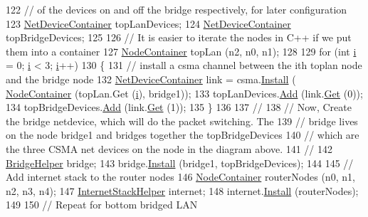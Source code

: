 \begin{DoxyCode}
122   \textcolor{comment}{// of the devices on and off the bridge respectively, for later configuration }
123   \hyperlink{classns3_1_1NetDeviceContainer}{NetDeviceContainer} topLanDevices;
124   \hyperlink{classns3_1_1NetDeviceContainer}{NetDeviceContainer} topBridgeDevices;
125 
126   \textcolor{comment}{// It is easier to iterate the nodes in C++ if we put them into a container}
127   \hyperlink{classns3_1_1NodeContainer}{NodeContainer} topLan (n2, n0, n1);
128 
129   \textcolor{keywordflow}{for} (\textcolor{keywordtype}{int} \hyperlink{bernuolliDistribution_8m_a6f6ccfcf58b31cb6412107d9d5281426}{i} = 0; \hyperlink{bernuolliDistribution_8m_a6f6ccfcf58b31cb6412107d9d5281426}{i} < 3; \hyperlink{bernuolliDistribution_8m_a6f6ccfcf58b31cb6412107d9d5281426}{i}++)
130     \{
131       \textcolor{comment}{// install a csma channel between the ith toplan node and the bridge node}
132       \hyperlink{classns3_1_1NetDeviceContainer}{NetDeviceContainer} link = csma.\hyperlink{classns3_1_1CsmaHelper_af79a91372595230b0817200270ab84e7}{Install} (
      \hyperlink{classns3_1_1NodeContainer}{NodeContainer} (topLan.Get (\hyperlink{bernuolliDistribution_8m_a6f6ccfcf58b31cb6412107d9d5281426}{i}), bridge1));
133       topLanDevices.\hyperlink{classns3_1_1NetDeviceContainer_a7ca8bc1d7ec00fd4fcc63869987fbda5}{Add} (link.\hyperlink{classns3_1_1NetDeviceContainer_a677d62594b5c9d2dea155cc5045f4d0b}{Get} (0));
134       topBridgeDevices.\hyperlink{classns3_1_1NetDeviceContainer_a7ca8bc1d7ec00fd4fcc63869987fbda5}{Add} (link.\hyperlink{classns3_1_1NetDeviceContainer_a677d62594b5c9d2dea155cc5045f4d0b}{Get} (1));
135     \}
136 
137   \textcolor{comment}{//}
138   \textcolor{comment}{// Now, Create the bridge netdevice, which will do the packet switching.  The}
139   \textcolor{comment}{// bridge lives on the node bridge1 and bridges together the topBridgeDevices}
140   \textcolor{comment}{// which are the three CSMA net devices on the node in the diagram above.}
141   \textcolor{comment}{//}
142   \hyperlink{classns3_1_1BridgeHelper}{BridgeHelper} bridge;
143   bridge.\hyperlink{classns3_1_1BridgeHelper_aba53f6381b7adda00d9163840b072fa6}{Install} (bridge1, topBridgeDevices);
144 
145   \textcolor{comment}{// Add internet stack to the router nodes}
146   \hyperlink{classns3_1_1NodeContainer}{NodeContainer} routerNodes (n0, n1, n2, n3, n4);
147   \hyperlink{classns3_1_1InternetStackHelper}{InternetStackHelper} internet;
148   internet.\hyperlink{classns3_1_1InternetStackHelper_a6645b412f31283d2d9bc3d8a95cebbc0}{Install} (routerNodes);
149 
150   \textcolor{comment}{// Repeat for bottom bridged LAN}

\end{DoxyCode}
